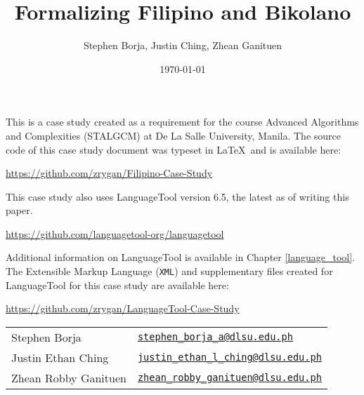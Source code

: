 \documentclass[12pt]{book}
\title{Formalizing Filipino and Bikolano}
\author{Stephen Borja, Justin Ching, Zhean Ganituen}
\date{\today}
\begin{document}
\maketitle

This is a case study created as a requirement for the course Advanced Algorithms and Complexities (STALGCM) at De La Salle University, Manila. The source code of this case study document was typeset in \LaTeX\, and is available here:

\begin{center}
  \url{https://github.com/zrygan/Filipino-Case-Study}
\end{center}

This case study also uses LanguageTool version 6.5, the latest as of writing this paper. 

\begin{center}
    \url{https://github.com/languagetool-org/languagetool} 
\end{center}

Additional information on LanguageTool is available in Chapter \ref{language_tool}. The Extensible Markup Language  (\texttt{XML}) and supplementary files created for LanguageTool for this case study are available here:

\label{languageTool_implementation}
\begin{center}
  \url{https://github.com/zrygan/LanguageTool-Case-Study}
\end{center}

\vspace*{\fill}

\begin{tabular}{l l}
  Stephen Borja        & \href{mailto:stephen_borja_a@dlsu.edu.ph}{\texttt{stephen\_borja\_a@dlsu.edu.ph}}            \\
  Justin Ethan Ching   & \href{mailto:justin_ethan_l_ching@dlsu.edu.ph}{\texttt{justin\_ethan\_l\_ching@dlsu.edu.ph}} \\
  Zhean Robby Ganituen & \href{mailto:zhean_robby_ganituen@dlsu.edu.ph}{\texttt{zhean\_robby\_ganituen@dlsu.edu.ph}}  \\
\end{tabular}

\tableofcontents
\lstlistoflistings








\printbibliography
\end{document}
